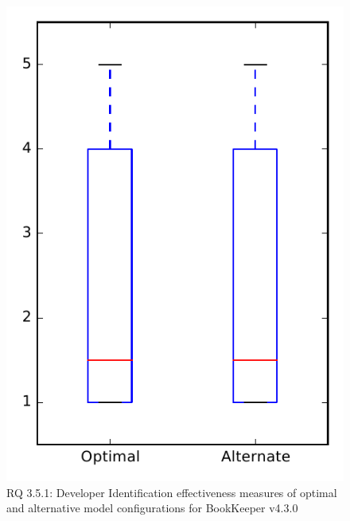 
\begin{figure}
\centering
\includegraphics[height=0.4\textheight]{figures/combo/dit_rq1_bookkeeper}
\caption{RQ 3.5.1: Developer Identification effectiveness measures of optimal and alternative model configurations for BookKeeper v4.3.0}
\label{fig:combo:dit:rq1:bookkeeper}
\end{figure}
